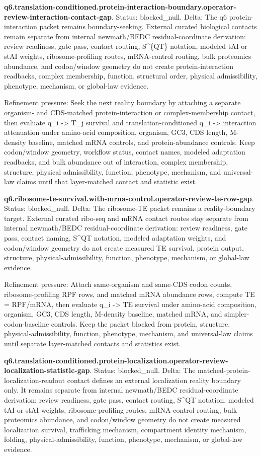 \textbf{q6.translation-conditioned.protein-interaction-boundary.operator-review-interaction-contact-gap}. Status: blocked\_null. Delta: The q6 protein-interaction packet remains boundary-seeking. External curated biological contacts remain separate from internal newmath/BEDC residual-coordinate derivation: review readiness, gate pass, contact routing, S\textasciicircum{}\{QT\} notation, modeled tAI or stAI weights, ribosome-profiling routes, mRNA-control routing, bulk proteomics abundance, and codon/window geometry do not create protein-interaction readbacks, complex membership, function, structural order, physical admissibility, phenotype, mechanism, or global-law evidence.

Refinement pressure: Seek the next reality boundary by attaching a separate organism- and CDS-matched protein-interaction or complex-membership contact, then evaluate q\_i -> T\_j survival and translation-conditioned q\_i -> interaction attenuation under amino-acid composition, organism, GC3, CDS length, M-density baseline, matched mRNA controls, and protein-abundance controls. Keep codon/window geometry, workflow status, contact names, modeled adaptation readbacks, and bulk abundance out of interaction, complex membership, structure, physical admissibility, function, phenotype, mechanism, and universal-law claims until that layer-matched contact and statistic exist.

\textbf{q6.ribosome-te-survival.with-mrna-control.operator-review-te-row-gap}. Status: blocked\_null. Delta: The ribosome-TE packet remains a reality-boundary target. External curated ribo-seq and mRNA contact routes stay separate from internal newmath/BEDC residual-coordinate derivation: review readiness, gate pass, contact naming, S\textasciicircum{}QT notation, modeled adaptation weights, and codon/window geometry do not create measured TE survival, protein output, structure, physical-admissibility, function, phenotype, mechanism, or global-law evidence.

Refinement pressure: Attach same-organism and same-CDS codon counts, ribosome-profiling RPF rows, and matched mRNA abundance rows, compute TE = RPF/mRNA, then evaluate q\_i -> TE survival under amino-acid composition, organism, GC3, CDS length, M-density baseline, matched mRNA, and simpler-codon-baseline controls. Keep the packet blocked from protein, structure, physical-admissibility, function, phenotype, mechanism, and universal-law claims until separate layer-matched contacts and statistics exist.

\textbf{q6.translation-conditioned.protein-localization.operator-review-localization-statistic-gap}. Status: blocked\_null. Delta: The matched-protein-localization-readout contact defines an external localization reality boundary only. It remains separate from internal newmath/BEDC residual-coordinate derivation: review readiness, gate pass, contact routing, S\textasciicircum{}QT notation, modeled tAI or stAI weights, ribosome-profiling routes, mRNA-control routing, bulk proteomics abundance, and codon/window geometry do not create measured localization survival, trafficking mechanism, compartment identity mechanism, folding, physical-admissibility, function, phenotype, mechanism, or global-law evidence.

